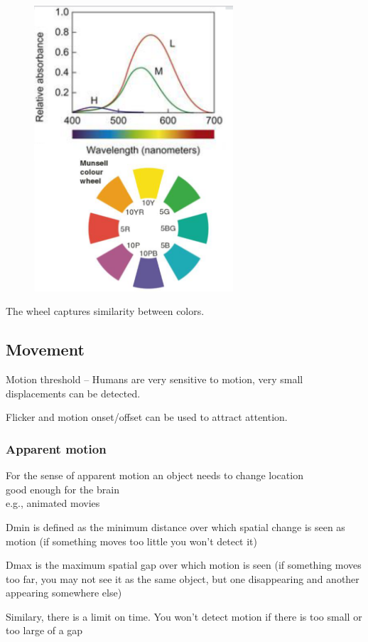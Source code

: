 \documentclass[]{project_plan}
\begin{document}
\begin{figure}[h!]
  \centering
  \includegraphics[width=20em]{color_contrast_and_similarity.png}
\end{figure}

The wheel captures similarity between colors.

\subsection{Movement}
Motion threshold – Humans are very sensitive to motion, very small displacements
can be detected.

Flicker and motion onset/offset can be used to attract attention.

\subsubsection{Apparent motion}
For the sense of apparent motion an object needs to change location\\
good enough for the brain\\
e.g., animated movies

Dmin is defined as the minimum distance over which spatial change is seen
as motion (if something moves too little you won't detect it)

Dmax is the maximum spatial gap over which motion is seen (if something moves too
far, you may not see it as the same object, but one disappearing and another appearing
somewhere else)

Similary, there is a limit on time. You won't detect motion if there is too small
or too large of a gap
\end{document}

